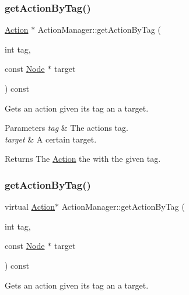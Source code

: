 \subsubsection{\texorpdfstring{get\+Action\+By\+Tag()}{getActionByTag()}\hspace{0.1cm}{\footnotesize\ttfamily [1/2]}}
{\footnotesize\ttfamily \hyperlink{classAction}{Action} $\ast$ Action\+Manager\+::get\+Action\+By\+Tag (\begin{DoxyParamCaption}\item[{int}]{tag,  }\item[{const \hyperlink{classNode}{Node} $\ast$}]{target }\end{DoxyParamCaption}) const}

Gets an action given its tag an a target.


\begin{DoxyParams}{Parameters}
{\em tag} & The action\textquotesingle{}s tag. \\
\hline
{\em target} & A certain target. \\
\hline
\end{DoxyParams}
\begin{DoxyReturn}{Returns}
The \hyperlink{classAction}{Action} the with the given tag. 
\end{DoxyReturn}
\mbox{\label{classActionManager_a7897adc3525956bd342378d8e6674fa8}} 
\subsubsection{\texorpdfstring{get\+Action\+By\+Tag()}{getActionByTag()}\hspace{0.1cm}{\footnotesize\ttfamily [2/2]}}
{\footnotesize\ttfamily virtual \hyperlink{classAction}{Action}$\ast$ Action\+Manager\+::get\+Action\+By\+Tag (\begin{DoxyParamCaption}\item[{int}]{tag,  }\item[{const \hyperlink{classNode}{Node} $\ast$}]{target }\end{DoxyParamCaption}) const\hspace{0.3cm}{\ttfamily [virtual]}}

Gets an action given its tag an a target.


